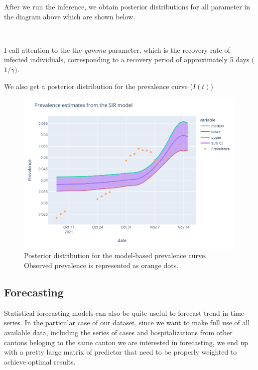 \documentclass[11pt]{article}
\begin{document}
After we run the inference, we obtain posterior distributions for all parameter in the diagram above which are shown below.
        
    \begin{center}
    \end{center}
    { \hspace*{\fill} \\}
    
I call attention to the the \textit{gamma} parameter, which is the recovery rate of infected individuals, corresponding to a recovery period of approximately 5 days ($1/\gamma)$.

We also get a posterior distribution for the prevalence curve ($I(t)$)

\begin{figure}
 \centering
 \includegraphics[width=\linewidth]{SIR_bayes.png}
 \caption{Posterior distribution for the model-based prevalence curve. Observed prevalence is represented as orange dots.}
 \label{fig:sir}
\end{figure}

    
    \hypertarget{forecasting}{%
\subsection{Forecasting}\label{forecasting}}

Statistical forecasting models can also be quite useful to forecast trend in time-series. In the particular case of our dataset, since we want to make full use of all available data, including the series of cases and hospitalizations from other cantons beloging to the same canton we are interested in forecasting, we end up with a pretty large matrix of predictor that need to be properly weighted to achieve optimal results.
\end{document}
